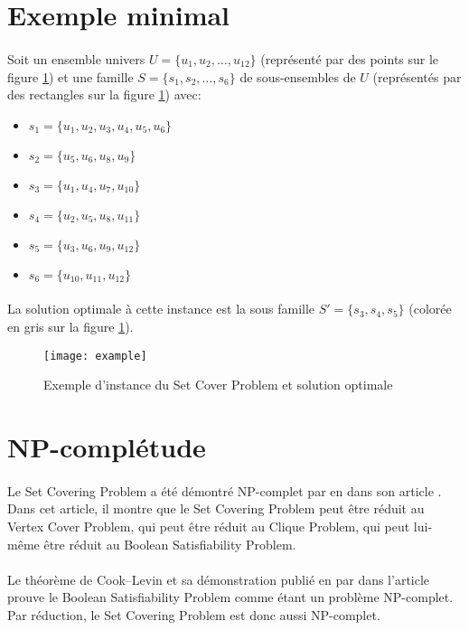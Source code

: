 \documentclass[12pt,letterpaper,twoside]{article}
\begin{document}
	\section{Exemple minimal}
		\paragraph*{}
			Soit un ensemble univers \(U = \{u_1, u_2, \dots, u_{12}\}\) (représenté par des points sur le figure \ref{fig:example}) et une famille \(S = \{s_1, s_2, \dots, s_6\}\) de sous-ensembles de \(U\) (représentés par des rectangles sur la figure \ref{fig:example}) avec:
			\begin{itemize}
				\item \(s_1 = \{u_1, u_2, u_3, u_4, u_5, u_6\}\)
				\item \(s_2 = \{u_5, u_6, u_8, u_9\}\)
				\item \(s_3 = \{u_1, u_4, u_7, u_{10}\}\)
				\item \(s_4 = \{u_2, u_5, u_8, u_{11}\}\)
				\item \(s_5 = \{u_3, u_6, u_9, u_{12}\}\)
				\item \(s_6 = \{u_{10}, u_{11}, u_{12}\}\)
			\end{itemize}
		\paragraph*{}
			La solution optimale à cette instance est la sous famille \(S'=\{s_3, s_4, s_5\}\) (colorée en gris sur la figure \ref{fig:example}).
		\begin{figure}[H]
			\centering%
			\texttt{[image: example]}%
			\caption{Exemple d'instance du Set Cover Problem et solution optimale\cite{Mount2017}}%
			\label{fig:example}%
		\end{figure}
	\section{NP-complétude}
		\paragraph*{}
			Le Set Covering Problem a été démontré NP-complet par \citeauthor{Karp1972} en \citeyear{Karp1972} dans son article \cite{Karp1972}. Dans cet article, il montre que le Set Covering Problem peut être réduit au Vertex Cover Problem, qui peut être réduit au Clique Problem, qui peut lui-même être réduit au Boolean Satisfiability Problem.
		\paragraph*{}
			Le théorème de Cook–Levin et sa démonstration publié en \citeyear{Cook1971} par \citeauthor{Cook1971} dans l'article \cite{Cook1971} prouve le Boolean Satisfiability Problem comme étant un problème NP-complet. Par réduction, le Set Covering Problem est donc aussi NP-complet.
	\newpage\printbibliography[heading=bibintoc]{}
\end{document}
